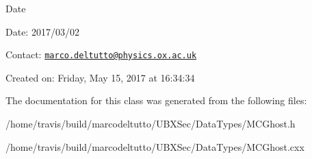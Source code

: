 \begin{DoxyDate}{\-Date}

\end{DoxyDate}
\begin{DoxyParagraph}{\-Date\-:}
2017/03/02 
\end{DoxyParagraph}


\-Contact\-: \href{mailto:marco.deltutto@physics.ox.ac.uk}{\tt marco.\-deltutto@physics.\-ox.\-ac.\-uk}

\-Created on\-: \-Friday, \-May 15, 2017 at 16\-:34\-:34 

\-The documentation for this class was generated from the following files\-:\begin{DoxyCompactItemize}
\item 
/home/travis/build/marcodeltutto/\-U\-B\-X\-Sec/\-Data\-Types/\-M\-C\-Ghost.\-h\item 
/home/travis/build/marcodeltutto/\-U\-B\-X\-Sec/\-Data\-Types/\-M\-C\-Ghost.\-cxx\end{DoxyCompactItemize}
